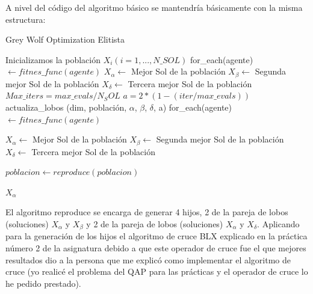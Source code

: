 \documentclass[a4paper]{report}
\begin{document}
A nivel del código del algoritmo básico se mantendría básicamente con la misma estructura:

\begin{algorithm}[H]
    \caption{Grey Wolf Optimization Elitista}\label{alg:GWO_mejorado}
    \begin{algorithmic}[1]
        \State Inicializamos la población $X_i (i=1,...,N\_SOL)$
        \State for\_each(agente) $ \gets fitnes\_func(agente)$
        \State $X_\alpha \gets$ Mejor Sol de la población
        \State $X_\beta \gets$ Segunda mejor Sol de la población
        \State $X_\delta \gets$ Tercera mejor Sol de la población
        \State $Max\_iters=max\_evals/N_SOL$
        \State $a=2*(1-(iter/max\_evals))$
        \State actualiza\_lobos (dim, población, $\alpha$, $\beta$, $\delta$, a)
        \State for\_each(agente) $ \gets fitnes\_func(agente)$

        \State $X_\alpha \gets$ Mejor Sol de la población
        \State $X_\beta \gets$ Segunda mejor Sol de la población
        \State $X_\delta \gets$ Tercera mejor Sol de la población

        \State $poblacion \gets reproduce(poblacion)$ 


        \EndFor

        \Return $X_\alpha $
        \EndFunction


    \end{algorithmic}
\end{algorithm}


El algoritmo reproduce se encarga de generar 4 hijos, 2 de la pareja de lobos (soluciones) $X_\alpha$ y $X_\beta$ y 2 de la pareja de lobos (soluciones) $X_\alpha$ y $X_\delta$. Aplicando para la generación de los hijos el algoritmo de cruce BLX explicado en la práctica número 2 de la asignatura debido a que este operador de cruce fue el que mejores resultados dio a la persona que me explicó como implementar el algoritmo de cruce (yo realicé el problema del QAP para las prácticas y el operador de cruce lo he pedido prestado).
\end{document}
